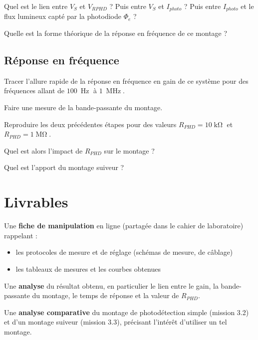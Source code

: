 \Quest Quel est le lien entre $V_S$ et $V_{RPHD}$ ? Puis entre $V_S$ et $I_{photo}$ ? Puis entre $I_{photo}$ et le flux lumineux capté par la photodiode $\Phi_e$ ?

\Quest Quelle est la forme théorique de la réponse en fréquence de ce montage ?

\subsection{Réponse en fréquence}

\Manip Tracer l'allure rapide de la réponse en fréquence en gain de ce système pour des fréquences allant de $100~\operatorname{Hz}$ à $1~\operatorname{MHz}$.

\Manip Faire une mesure de la bande-passante du montage.

\Manip Reproduire les deux précédentes étapes pour des valeurs $R_{PHD} = 10\operatorname{k\Omega}$ et $R_{PHD} = 1\operatorname{M\Omega}$. 

\Quest Quel est alors l'impact de $R_{PHD}$ sur le montage ?

\Quest Quel est l'apport du montage suiveur ?

\section{Livrables}

Une \textbf{fiche de manipulation} en ligne (partagée dans le cahier de laboratoire) rappelant :

\begin{itemize}
	\item les protocoles de mesure et de réglage (schémas de mesure, de câblage)
	\item les tableaux de mesures et les courbes obtenues
\end{itemize}

Une \textbf{analyse} du résultat obtenu, en particulier le lien entre le gain, la bande-passante du montage, le temps de réponse et la valeur de $R_{PHD}$.

Une \textbf{analyse comparative} du montage de photodétection simple (mission 3.2) et d'un montage suiveur (mission 3.3), précisant l'intérêt d'utiliser un tel montage.


